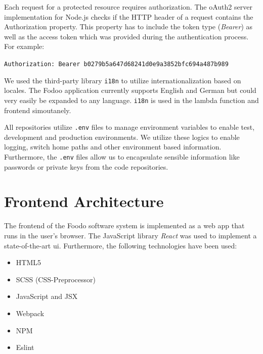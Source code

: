 
Each request for a protected resource requires authorization. The oAuth2 server implementation for Node.js checks if the HTTP header of a request contains the Authorization property. This property has to include the token type (\textit{Bearer}) as well as the access token which was provided during the authentication process. For example: \vspace{-1.5em}
\begin{center}
	\texttt{Authorization: Bearer b0279b5a647d68241d0e9a3852bfc694a487b989}
\end{center}


We used the third-party library \texttt{i18n} to utilize internationalization based on locales. The Fodoo application currently supports English and German but could very easily be expanded to any language. \texttt{i18n} is used in the lambda function and frontend simoutanely. 


All repositories utilize \texttt{.env} files to manage environment variables to enable test, development and production environments. We utilize these logics to enable logging, switch home paths and other environment based information. Furthermore, the \texttt{.env} files allow us to encapsulate sensible information like passwords or private keys from the code repositories.

\section{Frontend Architecture}

The frontend of the Foodo software system is implemented as a web app that runs in the user’s browser. The JavaScript library \textit{React} was used to implement a state-of-the-art \gls{ui}. Furthermore, the following technologies have been used:

\begin{itemize}
		\itemsep-0.5em
	\item HTML5
	\item SCSS (CSS-Preprocessor)
	\item JavaScript and JSX
	\item Webpack 
	\item NPM
	\item Eslint
\end{itemize}

